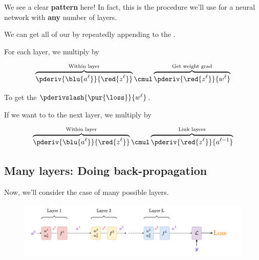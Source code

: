         We see a clear \textbf{pattern} here! In fact, this is the procedure we'll use for a neural network with \textbf{any} number of layers.\\
        
        \begin{concept}
            We can get all of our  by repeatedly appending to the .
            
            For each layer, we multiply by
            
            \begin{equation*}
                \overbrace{
                    \pderiv {\blu{a^\ell}} {\red{z^\ell}}
                }^{\text{Within layer}}
                    \cmul
                \overbrace{
                    \pderiv {\red{z^\ell}} {w^\ell}
                }^{\text{Get weight grad}}
            \end{equation*}
            
            To get the  $\pderivslash{ \pur{\loss} }{w^\ell}$.
            
            If we want to  to the next layer, we  multiply by
            
            \begin{equation*}
                \overbrace{
                    \pderiv {\blu{a^\ell}} {\red{z^\ell}}
                }^{\text{Within layer}}
                    \cmul
                \overbrace{
                    \pderiv {\red{z^\ell}} {a^{\ell-1}}
                }^{\text{Link layers}}
            \end{equation*}
            
        \end{concept}
        
    \secdiv
    
    \subsection{Many layers: Doing back-propagation}
    
        Now, we'll consider the case of many possible layers.
            
        \phantom{ }
            
        \begin{figure}[H]
            \centering
            \includegraphics[width=180mm,scale=0.4]{images/nn_1_5_images/network_bp.png}
        \end{figure}
        
